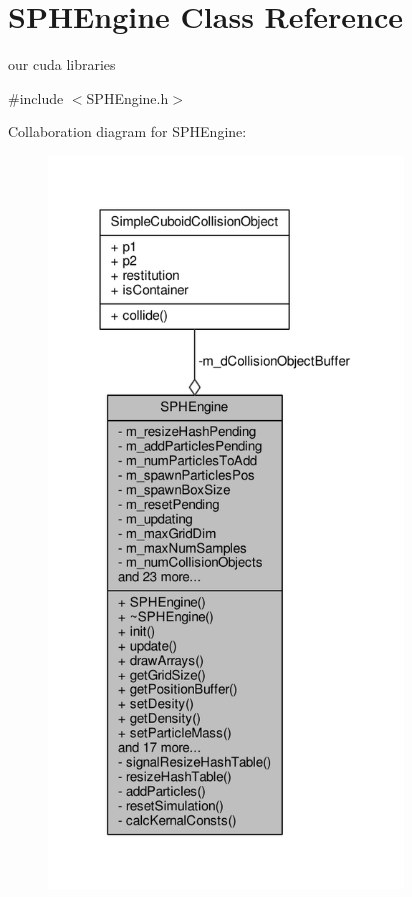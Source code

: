 \hypertarget{class_s_p_h_engine}{\section{S\-P\-H\-Engine Class Reference}
\label{class_s_p_h_engine}
}


our cuda libraries  




{\ttfamily \#include $<$S\-P\-H\-Engine.\-h$>$}



Collaboration diagram for S\-P\-H\-Engine\-:\nopagebreak
\begin{figure}[H]
\begin{center}
\leavevmode
\includegraphics[height=550pt]{class_s_p_h_engine__coll__graph}
\end{center}
\end{figure}
